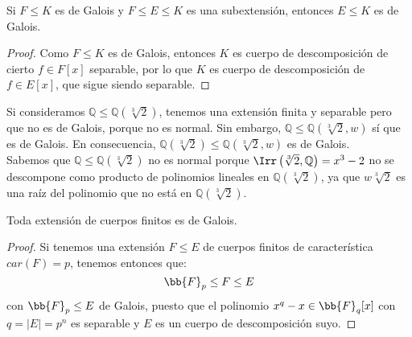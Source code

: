\begin{coro}
    Si $F\leq K$ es de Galois y $F\leq E\leq K$ es una subextensión, entonces $E\leq K$ es de Galois.
    \begin{proof}
        Como $F\leq K$ es de Galois, entonces $K$ es cuerpo de descomposición de cierto $f\in F[x]$ separable, por lo que $K$ es cuerpo de descomposición de $f\in E[x]$, que sigue siendo separable.
    \end{proof}
\end{coro}


\begin{ejemplo}
    Si consideramos $\mathbb{Q}\leq \mathbb{Q}\left(\sqrt[3]{2}\right)$, tenemos una extensión finita y separable pero que no es de Galois, porque no es normal. Sin embargo, $\mathbb{Q}\leq \mathbb{Q}\left(\sqrt[3]{2},w\right)$ sí que es de Galois. En consecuencia, $\mathbb{Q}(\sqrt[3]{2})\leq \mathbb{Q}\left(\sqrt[3]{2},w\right)$ es de Galois.\\

    \noindent
    Sabemos que $\mathbb{Q}\leq \mathbb{Q}\left(\sqrt[3]{2}\right)$ no es normal porque $\Irr\left(\sqrt[3]{2},\mathbb{Q}\right) = x^3-2$ no se descompone como producto de polinomios lineales en $\mathbb{Q}\left(\sqrt[3]{2}\right)$, ya que $w\sqrt[3]{2}$ es una raíz del polinomio que no está en $\mathbb{Q}\left(\sqrt[3]{2}\right)$.
\end{ejemplo}

\begin{coro}
    Toda extensión de cuerpos finitos es de Galois.
    \begin{proof}
        Si tenemos una extensión $F\leq E$ de cuerpos finitos de característica $car(F)=p$, tenemos entonces que:
        \begin{equation*}
            \bb{F}_p\leq F \leq E
        \end{equation*}
        con $\bb{F}_p\leq E$ de Galois, puesto que el polinomio $x^q-x \in \bb{F}_q[x]$ con $q=|E| = p^n$ es separable y $E$ es un cuerpo de descomposición suyo.
    \end{proof}
\end{coro}

